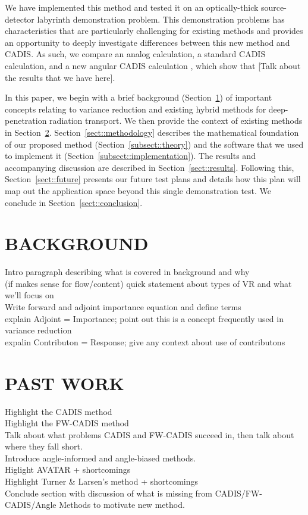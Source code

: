 \documentclass[12pt]{article}
\begin{document}
We have implemented this method and tested it on an optically-thick source-detector labyrinth demonstration problem. 
This demonstration problems has characteristics that are particularly challenging for existing methods and provides an opportunity to deeply investigate differences between this new method and CADIS.
As such, we compare an analog calculation, a standard CADIS calculation, and a new angular CADIS calculation
, which show that [Talk about the results that we have here]. 

In this paper, we begin with a brief background (Section~\ref{sect::second}) of important concepts relating to variance reduction and existing hybrid methods for deep-penetration radiation transport.
We then provide the context of existing methods in Section~\ref{sec::past}. 
Section~\ref{sect::methodology} describes the mathematical foundation of our proposed method (Section~\ref{subsect::theory}) and the software that we used to implement it (Section~\ref{subsect::implementation}). 
The results and accompanying discussion are described in Section~\ref{sect::results}. Following this, Section~\ref{sect::future} presents our future test plans and details how this plan will map out the application space beyond this single demonstration test. 
We conclude in Section~\ref{sect::conclusion}. 


%
\section{BACKGROUND}
\label{sect::second}

Intro paragraph describing what is covered in background and why\\
(if makes sense for flow/content) quick statement about types of VR and what we'll focus on\\
Write forward and adjoint importance equation and define terms\\
explain Adjoint = Importance; point out this is a concept frequently used in variance reduction \\
expalin Contributon = Response; give any context about use of contributons \\

\section{PAST WORK}
\label{sec::past}
Highlight the CADIS method \\
Highlight the FW-CADIS method \\
Talk about what problems CADIS and FW-CADIS succeed in, then talk about where they fall short. \\
Introduce angle-informed and angle-biased methods. \\
Higlight AVATAR + shortcomings \\
Highlight Turner \& Larsen's method + shortcomings\\
Conclude section with discussion of what is missing from CADIS/FW-CADIS/Angle Methods to motivate new method. \\
\end{document}

